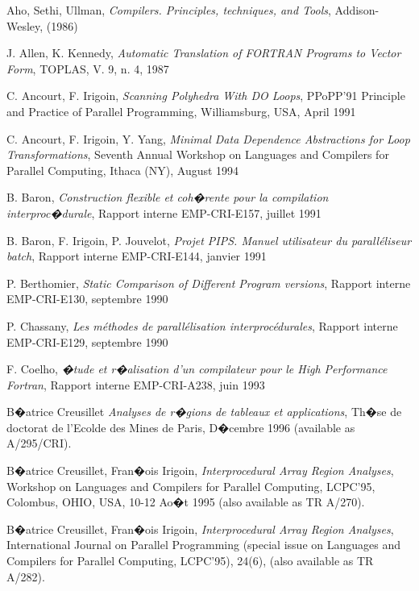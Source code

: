 \documentclass[a4paper]{report}
\begin{document}
\begin{thebibliography}{99}

 Aho, Sethi, Ullman,
{\it Compilers. Principles, techniques, and Tools},
Addison-Wesley, (1986)

 J. Allen, K. Kennedy,
{\em Automatic Translation of {FORTRAN} Programs to Vector Form},
TOPLAS, V. 9, n. 4, 1987

   C. Ancourt, F. Irigoin,
{\em Scanning Polyhedra With DO Loops},
PPoPP'91 Principle and Practice of Parallel Programming, Williamsburg, USA,
April 1991

    C. Ancourt, F. Irigoin, Y. Yang,
{\em Minimal Data Dependence Abstractions for Loop Transformations},
Seventh Annual Workshop on Languages and Compilers for Parallel
Computing, Ithaca (NY), August 1994

   B. Baron,
{\em Construction flexible et coh�rente pour la compilation interproc�durale},
Rapport interne EMP-CRI-E157, juillet 1991

   B. Baron, F. Irigoin, P. Jouvelot,
{\em Projet PIPS. Manuel utilisateur du pa\-ral\-l\'e\-liseur batch},
Rapport interne EMP-CRI-E144, janvier 1991

   P. Berthomier,
{\em Static Comparison of Different Program versions},
Rapport interne EMP-CRI-E130, septembre 1990

   P. Chassany,
{\em Les m\'ethodes de parall\'elisation interproc\'edurales},
Rapport interne EMP-CRI-E129, septembre 1990

   F. Coelho,
{\em �tude et r�alisation d'un compilateur pour le {\em High
Performance Fortran}},
Rapport interne EMP-CRI-A238, juin 1993

 
   B�atrice Creusillet {\em
Analyses de r�gions de tableaux et applications}, 
Th�se de doctorat de l'Ecolde des Mines de Paris,
D�cembre 1996 (available as A/295/CRI).
 
   B�atrice Creusillet, Fran�ois Irigoin, {\em
Interprocedural Array Region Analyses}, Workshop on Languages and
Compilers for Parallel Computing, LCPC'95, Colombus, OHIO, USA, 10-12
Ao�t 1995 (also available as TR A/270).

   B�atrice Creusillet, Fran�ois Irigoin, {\em Interprocedural
    Array Region Analyses}, International Journal on Parallel Programming
  (special issue on Languages and Compilers for Parallel Computing, LCPC'95),
  24(6), (also available as TR A/282).


\end{thebibliography}
\end{document}

